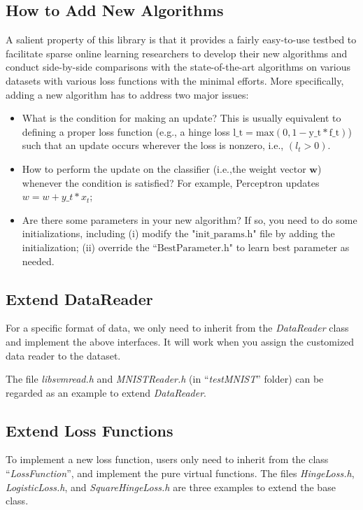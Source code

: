 \documentclass[11pt,a4paper]{article}
\newlength{\wideitemsep}
\let\olditem\item
\renewcommand{\item}{\setlength{\itemsep}{\wideitemsep}\olditem}
\begin{document}
\subsection{How to Add New Algorithms}
A salient property of this library is that it provides a fairly easy-to-use
testbed to facilitate sparse online learning researchers to develop their new
algorithms and conduct side-by-side comparisons with the state-of-the-art
algorithms on various datasets with various loss functions with the minimal
efforts.  More specifically, adding a new algorithm has to address two major
issues:
\begin{itemize}
    \item What is the condition for making an update? This is usually equivalent to defining a proper loss function (e.g., a hinge loss $\mathrm{l\_t=max(0,1-y\_t*f\_t)}$) such that an update occurs wherever the loss is nonzero, i.e., $(l_t>0)$.

    \item How to perform the update on the classifier (i.e.,the weight vector $\mathbf{w}$) whenever the condition is satisfied? For example, Perceptron updates $w = w + y\_t*x_t$;

    \item Are there some parameters in your new algorithm? If so, you need to
        do some initializations, including (i) modify the
        "$\mathrm{init\_params.h}$" file by adding the initialization; (ii)
        override the ``$\mathrm{BestParameter.h}$" to learn best parameter as needed.
\end{itemize}


\subsection{Extend DataReader}

For a specific format of data, we only need to inherit from the
\emph{DataReader} class and implement the above interfaces. It will work when
you assign the customized data reader to the dataset.

The file \emph{libsvmread.h} and \emph{MNISTReader.h} (in ``\emph{testMNIST}''
folder) can be regarded as an example to extend \emph{DataReader}.

\subsection{Extend Loss Functions}\label{sec:extend_loss_func}
To implement a new loss function, users only need to inherit from the class
``\emph{LossFunction}'', and implement the pure virtual functions.  The files
\emph{HingeLoss.h}, \emph{LogisticLoss.h}, and \emph{SquareHingeLoss.h} are
three examples to extend the base class. 
\end{document}
